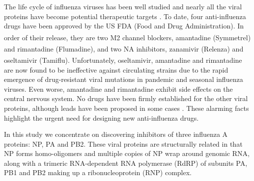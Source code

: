 The life cycle of influenza viruses has been well studied \citep{1539,1522,1525} and nearly all the viral proteins have become potential therapeutic targets \citep{1539,1519,1229,1523,1525}. To date, four anti-influenza drugs have been approved by the US FDA (Food and Drug Administration). In order of their release, they are two M2 channel blockers, amantadine (Symmetrel\textsuperscript{\textregistered}) and rimantadine (Flumadine\textsuperscript{\textregistered}), and two NA inhibitors, zanamivir (Relenza\textsuperscript{\textregistered}) and oseltamivir (Tamiflu\textsuperscript{\textregistered}). Unfortunately, oseltamivir, amantadine and rimantadine are now found to be ineffective against circulating strains due to the rapid emergence of drug-resistant viral mutations in pandemic and seasonal influenza viruses. Even worse, amantadine and rimantadine exhibit side effects on the central nervous system. No drugs have been firmly established for the other viral proteins, although leads have been proposed in some cases \citep{1229,1522,1523,1525}. These alarming facts highlight the urgent need for designing new anti-influenza drugs.


In this study we concentrate on discovering inhibitors of three influenza A proteins: NP, PA and PB2. These viral proteins are structurally related in that NP forms homo-oligomers and multiple copies of NP wrap around genomic RNA, along with a trimeric RNA-dependent RNA polymerase (RdRP) of subunits PA, PB1 and PB2 making up a ribonucleoprotein (RNP) complex.

